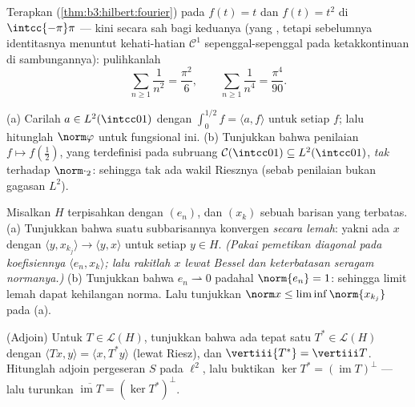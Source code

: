\begin{exercise}[$\star\star$]\label{exo:b3:hilbert:5}
Terapkan  (\cref{thm:b3:hilbert:fourier}) pada $f(t) = t$
dan $f(t) = t^2$ di $\intcc{-\pi}\pi$ --- kini secara sah bagi
keduanya (yang , tetapi sebelumnya identitasnya menuntut
kehati-hatian $\mathcal C^1$ sepenggal-sepenggal pada ketakkontinuan di sambungannya):
pulihkanlah
\[
\sum_{n\geq1}\frac1{n^2} = \frac{\pi^2}6,
\qquad
\sum_{n\geq1}\frac1{n^4} = \frac{\pi^4}{90} .
\]
\end{exercise}

\begin{exercise}[$\star\star$]\label{exo:b3:hilbert:6}
(a) Carilah $a \in L^2(\intcc01)$ dengan $\int_0^{1/2}f =
\langle a, f\rangle$ untuk setiap $f$; lalu hitunglah $\norm\varphi$ untuk
fungsional ini.
(b) Tunjukkan bahwa penilaian $f \mapsto f(\frac12)$, yang terdefinisi
pada subruang $\mathcal C(\intcc01) \subseteq
L^2(\intcc01)$, \emph{tak}  terhadap
$\norm\cdot_2$: sehingga tak ada wakil Riesznya (sebab penilaian bukan
gagasan $L^2$).
\end{exercise}

\begin{exercise}[$\star\star\star$]\label{exo:b3:hilbert:7}
Misalkan $H$ terpisahkan dengan  $(e_n)$, dan $(x_k)$ sebuah
barisan yang terbatas.
(a) Tunjukkan bahwa suatu subbarisannya konvergen \emph{secara lemah}: yakni
ada $x$ dengan $\langle y, x_{k_j}\rangle \to \langle y,
x\rangle$ untuk setiap $y \in H$. \emph{(Pakai pemetikan diagonal pada
koefisiennya $\langle e_n, x_k\rangle$; lalu rakitlah $x$ lewat
Bessel dan keterbatasan seragam normanya.)}
(b) Tunjukkan bahwa $e_n \rightharpoonup 0$ padahal $\norm{e_n} = 1$: sehingga limit
lemah dapat kehilangan norma. Lalu tunjukkan $\norm x \leq
\liminf\norm{x_{k_j}}$ pada (a).
\end{exercise}

\begin{exercise}[$\star\star$]\label{exo:b3:hilbert:8}
(Adjoin) Untuk $T \in \mathcal L(H)$, tunjukkan bahwa ada tepat satu
$T^* \in \mathcal L(H)$ dengan $\langle Tx, y\rangle = \langle
x, T^*y\rangle$ (lewat Riesz), dan $\vertiii{T^*} = \vertiii T$.
Hitunglah adjoin pergeseran $S$ pada $\ell^2$, lalu buktikan
$\ker T^* = (\operatorname{im}T)^\perp$ --- lalu turunkan
$\overline{\operatorname{im}T} = (\ker T^*)^\perp$.
\end{exercise}


